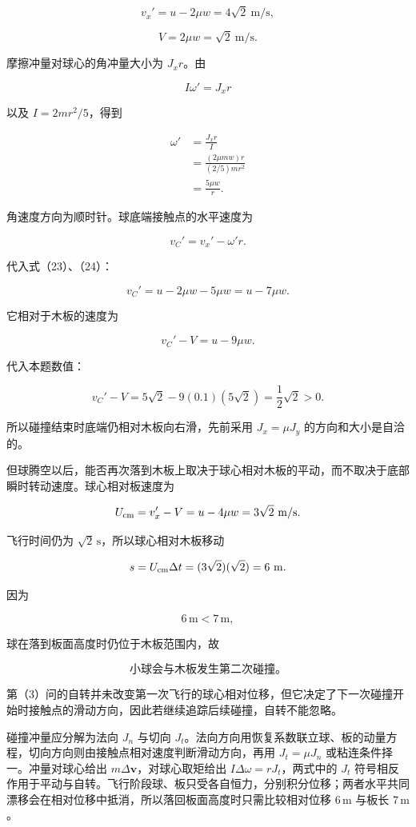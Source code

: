 \documentclass[12pt,a4paper,UTF8]{ctexart}
\begin{document}
\[v_x'=u-2\mu w=4\sqrt2\ \mathrm{m/s},\]

\[V=2\mu w=\sqrt2\ \mathrm{m/s}.\]

摩擦冲量对球心的角冲量大小为 \(J_xr\)。由

\[I\omega'=J_xr\]

以及 \(I=2mr^2/5\)，得到

\[\begin{aligned}
\omega'
&=\frac{J_xr}{I}\\
&=\frac{(2\mu mw)r}{(2/5)mr^2}\\
&=\frac{5\mu w}{r}.
\end{aligned}\]

角速度方向为顺时针。球底端接触点的水平速度为

\[v_C'=v_x'-\omega'r.\]

代入式（23）、（24）：

\[v_C'=u-2\mu w-5\mu w=u-7\mu w.\]

它相对于木板的速度为

\[v_C'-V=u-9\mu w.\]

代入本题数值：

\[v_C'-V=5\sqrt2-9(0.1)(5\sqrt2)=\frac12\sqrt2>0.\]

所以碰撞结束时底端仍相对木板向右滑，先前采用 \(J_x=\mu J_y\)
的方向和大小是自洽的。

但球腾空以后，能否再次落到木板上取决于球心相对木板的平动，而不取决于底部瞬时转动速度。球心相对板速度为

\[U_{\rm cm}=v_x'-V=u-4\mu w=3\sqrt2\ \mathrm{m/s}.\]

飞行时间仍为 \(\sqrt2\,\mathrm s\)，所以球心相对木板移动

\[s=U_{\rm cm}\Delta t=(3\sqrt2)(\sqrt2)=6\ \mathrm m.\]

因为

\[6\,\mathrm m<7\,\mathrm m,\]

球在落到板面高度时仍位于木板范围内，故

\[\boxed{\text{小球会与木板发生第二次碰撞。}}\]

第（3）问的自转并未改变第一次飞行的球心相对位移，但它决定了下一次碰撞开始时接触点的滑动方向，因此若继续追踪后续碰撞，自转不能忽略。

碰撞冲量应分解为法向 \(J_n\) 与切向
\(J_t\)。法向方向用恢复系数联立球、板的动量方程，切向方向则由接触点相对速度判断滑动方向，再用
\(J_t=\mu J_n\) 或粘连条件择一。冲量对球心给出
\(m\Delta\bm v\)，对球心取矩给出 \(I\Delta\omega=rJ_t\)，两式中的
\(J_t\)
符号相反作用于平动与自转。飞行阶段球、板只受各自恒力，分别积分位移；两者水平共同漂移会在相对位移中抵消，所以落回板面高度时只需比较相对位移
\(6\,\mathrm m\) 与板长 \(7\,\mathrm m\)。
\end{document}
